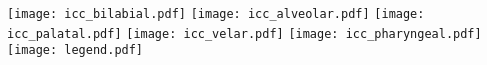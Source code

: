 \documentclass[varwidth=7in]{standalone}
\begin{document}
\raggedright

\texttt{[image: icc\_bilabial.pdf]}%
\texttt{[image: icc\_alveolar.pdf]}%
\texttt{[image: icc\_palatal.pdf]}%
\texttt{[image: icc\_velar.pdf]}%
\texttt{[image: icc\_pharyngeal.pdf]}%
\texttt{[image: legend.pdf]}
\end{document}
